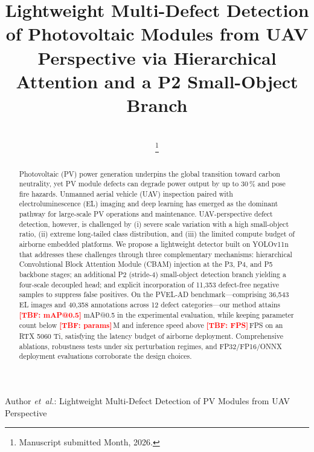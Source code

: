 \documentclass[journal,onecolumn,11pt]{IEEEtran}
\makeatletter
\newcommand{\TBF}[1]{\textcolor{red}{\textbf{[TBF: #1]}}} %
\newcommand{\mAPHalf}{\TBF{mAP@0.5}}
\newcommand{\paramsM}{\TBF{params}}
\newcommand{\fpsVal}{\TBF{FPS}}
\makeatother
\begin{document}
\title{Lightweight Multi-Defect Detection of Photovoltaic Modules from UAV Perspective via Hierarchical Attention and a P2 Small-Object Branch}

\author{
\\
\thanks{Manuscript submitted Month, 2026.}
}

%
{Author \MakeLowercase{\textit{et~al.}}: Lightweight Multi-Defect Detection of PV Modules from UAV Perspective}

\maketitle

\begin{abstract}
Photovoltaic (PV) power generation underpins the global transition toward carbon neutrality, yet PV module defects can degrade power output by up to 30\,\% and pose fire hazards. Unmanned aerial vehicle (UAV) inspection paired with electroluminescence (EL) imaging and deep learning has emerged as the dominant pathway for large-scale PV operations and maintenance. UAV-perspective defect detection, however, is challenged by (i) severe scale variation with a high small-object ratio, (ii) extreme long-tailed class distribution, and (iii) the limited compute budget of airborne embedded platforms. We propose a lightweight detector built on YOLOv11n that addresses these challenges through three complementary mechanisms: hierarchical Convolutional Block Attention Module (CBAM) injection at the P3, P4, and P5 backbone stages; an additional P2 (stride-4) small-object detection branch yielding a four-scale decoupled head; and explicit incorporation of 11{,}353 defect-free negative samples to suppress false positives. On the PVEL-AD benchmark---comprising 36{,}543 EL images and 40{,}358 annotations across 12 defect categories---our method attains \mAPHalf{} mAP@0.5 in the experimental evaluation, while keeping parameter count below \paramsM\,M and inference speed above \fpsVal\,FPS on an RTX 5060 Ti, satisfying the latency budget of airborne deployment. Comprehensive ablations, robustness tests under six perturbation regimes, and FP32/FP16/ONNX deployment evaluations corroborate the design choices.
\end{abstract}
\end{document}
